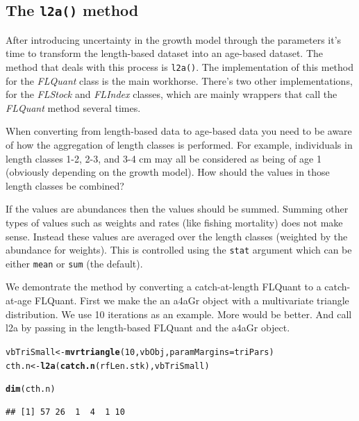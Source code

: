 \documentclass[a4paper,english,10pt]{article}\usepackage[]{graphicx}\usepackage[]{color}
\makeatletter
\newcommand{\hlnum}[1]{\textcolor[rgb]{0.686,0.059,0.569}{#1}}%
\newcommand{\hlstd}[1]{\textcolor[rgb]{0.345,0.345,0.345}{#1}}%
\newcommand{\hlkwb}[1]{\textcolor[rgb]{0.69,0.353,0.396}{#1}}%
\newcommand{\hlkwc}[1]{\textcolor[rgb]{0.333,0.667,0.333}{#1}}%
\newcommand{\hlkwd}[1]{\textcolor[rgb]{0.737,0.353,0.396}{\textbf{#1}}}%
\newenvironment{kframe}{%
 \def\at@end@of@kframe{}%
 \ifinner\ifhmode%
  \def\at@end@of@kframe{\end{minipage}}%
  \begin{minipage}{\columnwidth}%
 \fi\fi%
 \def\FrameCommand##1{\hskip\@totalleftmargin \hskip-\fboxsep
 \colorbox{shadecolor}{##1}\hskip-\fboxsep
     \hskip-\linewidth \hskip-\@totalleftmargin \hskip\columnwidth}%
 \MakeFramed {\advance\hsize-\width
   \@totalleftmargin\z@ \linewidth\hsize
   \@setminipage}}%
 {\par\unskip\endMakeFramed%
 \at@end@of@kframe}
\newenvironment{knitrout}{}{} %
\newcommand{\code}[1]{{\texttt{#1}}}
\newcommand{\class}[1]{{\textit{#1}}}
\makeatother
\begin{document}
\subsection{The \code{l2a()} method}

After introducing uncertainty in the growth model through the parameters it's time to transform the length-based dataset into an age-based dataset. The method that deals with this process is \code{l2a()}. The implementation of this method for the \class{FLQuant} class is the main workhorse. There's two other implementations, for the \class{FLStock} and \class{FLIndex} classes, which are mainly wrappers that call the \class{FLQuant} method several times.

When converting from length-based data to age-based data you need to be aware of how the aggregation of length classes is performed. For example, individuals in length classes 1-2, 2-3, and 3-4 cm may all be considered as being of age 1 (obviously depending on the growth model). How should the values in those length classes be combined?

If the values are abundances then the values should be summed. Summing other types of values such as weights and rates (like fishing mortality) does not make sense. Instead these values are averaged over the length classes (weighted by the abundance for weights). This is controlled using the \code{stat} argument which can be either \code{mean} or \code{sum} (the default).

We demontrate the method by converting a catch-at-length FLQuant to a catch-at-age FLQuant. First we make the an a4aGr object with a multivariate triangle distribution. We use 10 iterations as an example. More would be better. And call l2a by passing in the length-based FLQuant and the a4aGr object.

\begin{knitrout}
\color{fgcolor}\begin{kframe}
\begin{alltt}
\hlstd{vbTriSmall} \hlkwb{<-} \hlkwd{mvrtriangle}\hlstd{(}\hlnum{10}\hlstd{, vbObj,} \hlkwc{paramMargins} \hlstd{= triPars)}
\hlstd{cth.n} \hlkwb{<-} \hlkwd{l2a}\hlstd{(}\hlkwd{catch.n}\hlstd{(rfLen.stk), vbTriSmall)}
\end{alltt}
\end{kframe}
\end{knitrout}


\begin{knitrout}
\color{fgcolor}\begin{kframe}
\begin{alltt}
\hlkwd{dim}\hlstd{(cth.n)}
\end{alltt}
\begin{verbatim}
## [1] 57 26  1  4  1 10
\end{verbatim}
\end{kframe}
\end{knitrout}
\end{document}
